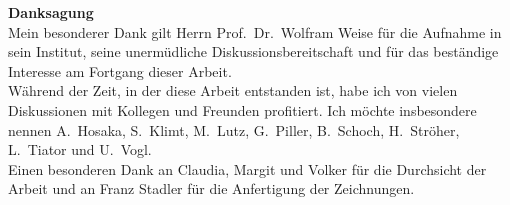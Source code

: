 {\Large\bf  Danksagung}\\[2.0cm]
Mein besonderer Dank gilt Herrn Prof.~Dr.~Wolfram Weise f\"ur
die Aufnahme in sein Institut, seine unerm\"udliche
Diskussionsbereitschaft und f\"ur das best\"andige 
Interesse am Fortgang dieser Arbeit.\\

W\"ahrend der Zeit, in der diese Arbeit entstanden ist, 
habe ich von vielen Diskussionen mit Kollegen und Freunden 
profitiert. Ich m\"ochte insbesondere nennen A.~Hosaka, 
S.~Klimt, M.~Lutz, G.~Piller, B.~Schoch, H.~Str\"oher, L.~Tiator
und U.~Vogl.  \\

Einen besonderen Dank an Claudia, Margit und Volker f\"ur die
Durchsicht der Arbeit und an Franz Stadler f\"ur die Anfertigung
der Zeichnungen. 
